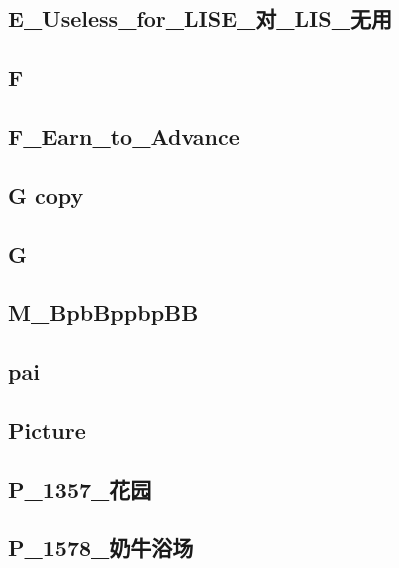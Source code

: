 \subsection{E_Useless_for_LISE_对_LIS_无用}
\raggedbottom
\hrulefill
\subsection{F}
\raggedbottom
\hrulefill
\subsection{F_Earn_to_Advance}
\raggedbottom
\hrulefill
\subsection{G copy}
\raggedbottom
\hrulefill
\subsection{G}
\raggedbottom
\hrulefill
\subsection{M_BpbBppbpBB}
\raggedbottom
\hrulefill
\subsection{pai}
\raggedbottom
\hrulefill
\subsection{Picture}
\raggedbottom
\hrulefill
\subsection{P_1357_花园}
\raggedbottom
\hrulefill
\subsection{P_1578_奶牛浴场}
\raggedbottom
\hrulefill
